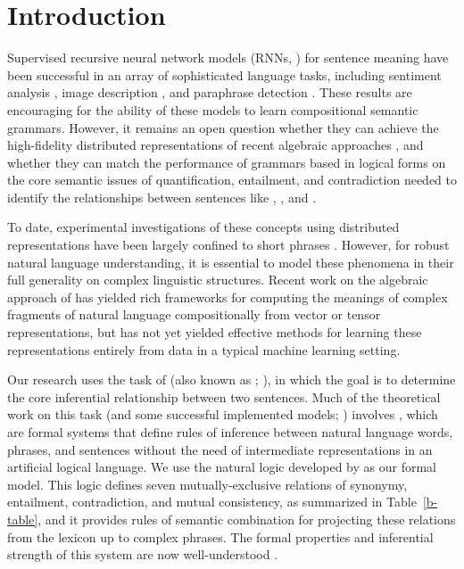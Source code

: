 \section{Introduction}\label{sec:intro}


Supervised recursive neural network models (RNNs, ) for sentence meaning
have been successful in an array of sophisticated language tasks,
including sentiment analysis \cite{socher2011semi,irsoydeep},
image description \cite{sochergrounded}, and paraphrase detection
\cite{Socher-etal:2011:Paraphrase}. These results are encouraging for
the ability of these models to learn compositional semantic grammars.
However, it remains an open question whether they can achieve the
high-fidelity distributed representations of recent algebraic
approaches \cite{ClarkCoeckeSadrzadeh2011,grefenstette2013towards,Hermann-etal:2013,rocktaschellow},
and whether they can match the performance of grammars based in logical forms
\cite{Warren:Pereira:1982,Zelle:Mooney:1996,ZetCol:2005,LiangJordan:2013}
on the core semantic issues of quantification,
entailment, and contradiction needed to identify the relationships
between sentences like , , and .


To date, experimental investigations of these concepts using
distributed representations have been largely confined to short
phrases \cite{Mitchell:Lapata:2010,Grefenstette-etal:2011,baroni2012entailment}.
However, for robust natural language understanding, it is essential to
model these phenomena in their full generality on complex linguistic
structures. Recent work on the algebraic approach of
 has yielded rich frameworks 
for computing the meanings of complex fragments of natural
language compositionally from vector or tensor representations, but 
has not yet yielded effective methods for learning these representations
entirely from data in a typical machine learning setting.

Our research uses the task of  
(also known as ;
\citealt{dagan2006pascal}), in which the goal is to determine the core
inferential relationship between two sentences. Much of the
theoretical work on this task (and some successful implemented models;
\citealt{maccartney2009extended,watanabe2012latent}) involves , which are formal systems that define rules of inference
between natural language words, phrases, and sentences without the
need of intermediate representations in an artificial logical
language. We use the natural logic developed by
 as our formal model. This logic
defines seven mutually-exclusive relations of synonymy, entailment, contradiction,
and mutual consistency, as summarized in Table~\ref{b-table}, and it
provides rules of semantic combination for projecting these relations
from the lexicon up to complex phrases. The formal properties and
inferential strength of this system are now well-understood
\cite{Icard:Moss:2013,Icard:Moss:2013:LILT}.

